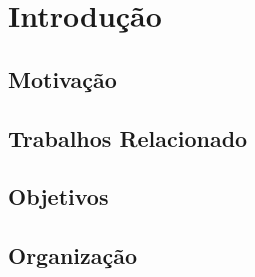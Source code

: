 \chapter{Introdução}



\section{Motivação}



\section{Trabalhos Relacionado}

\section{Objetivos}

\section{Organização}

